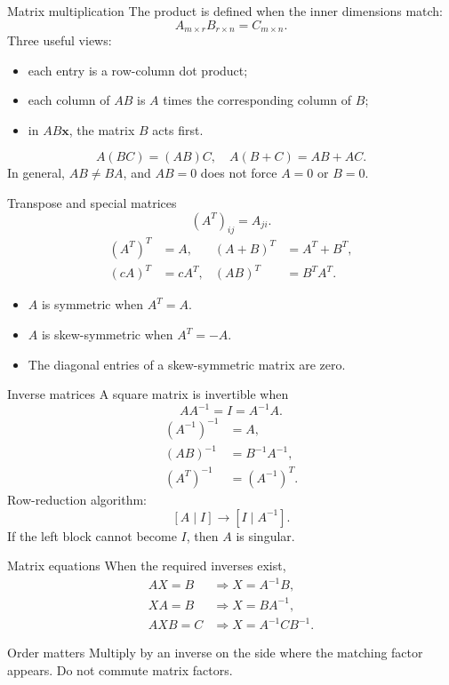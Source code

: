 \documentclass[aspectratio=169]{beamer}
\newcommand{\vect}[1]{\mathbf{#1}}
\begin{document}
\begin{frame}{Matrix multiplication}
The product is defined when the inner dimensions match:
\[
A_{m\times r}B_{r\times n}=C_{m\times n}.
\]
Three useful views:
\begin{itemize}
  \item each entry is a row-column dot product;
  \item each column of $AB$ is $A$ times the corresponding column of $B$;
  \item in $AB\vect x$, the matrix $B$ acts first.
\end{itemize}
\[
A(BC)=(AB)C,
\quad
A(B+C)=AB+AC.
\]
In general, $AB\ne BA$, and $AB=0$ does not force $A=0$ or $B=0$.
\end{frame}

\begin{frame}{Transpose and special matrices}
\[
(A^T)_{ij}=A_{ji}.
\]
\begin{align*}
(A^T)^T&=A,&
(A+B)^T&=A^T+B^T,\\
(cA)^T&=cA^T,&
(AB)^T&=B^TA^T.
\end{align*}
\begin{itemize}
  \item $A$ is symmetric when $A^T=A$.
  \item $A$ is skew-symmetric when $A^T=-A$.
  \item The diagonal entries of a skew-symmetric matrix are zero.
\end{itemize}
\end{frame}

\begin{frame}{Inverse matrices}
A square matrix is invertible when
\[
AA^{-1}=I=A^{-1}A.
\]
\begin{align*}
(A^{-1})^{-1}&=A,\\
(AB)^{-1}&=B^{-1}A^{-1},\\
(A^T)^{-1}&=(A^{-1})^T.
\end{align*}
Row-reduction algorithm:
\[
[A\mid I]\longrightarrow[I\mid A^{-1}].
\]
If the left block cannot become $I$, then $A$ is singular.
\end{frame}

\begin{frame}{Matrix equations}
When the required inverses exist,
\begin{align*}
AX=B &\Longrightarrow X=A^{-1}B,\\
XA=B &\Longrightarrow X=BA^{-1},\\
AXB=C &\Longrightarrow X=A^{-1}CB^{-1}.
\end{align*}
\begin{alertblock}{Order matters}
Multiply by an inverse on the side where the matching factor appears. Do not commute matrix factors.
\end{alertblock}
\end{frame}
\end{document}
